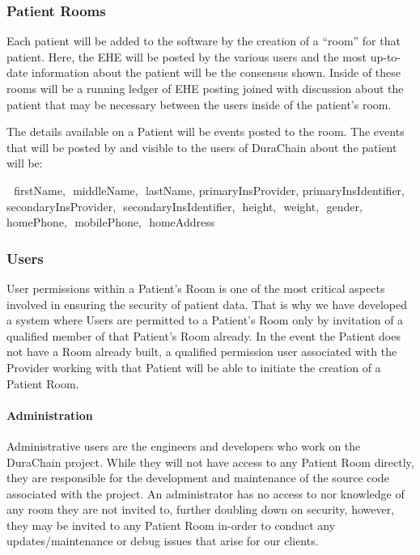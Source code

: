 \documentclass[12pt]{article}
\begin{document}
    \subsubsection{Patient Rooms}
    Each patient will be added to the software by the creation of a “room” for that patient. Here, the EHE will be posted by the various users and the most up-to-date information about the patient will be the consensus shown. Inside of these rooms will be a running ledger of EHE posting joined with discussion about the patient that may be necessary between the users inside of the patient’s room.

    The details available on a Patient will be events posted to the room. The events that will be posted by and visible to the users of DuraChain about the patient will be:

    { 
    firstName, 
    middleName, 
    lastName,
    primaryInsProvider,
    primaryInsIdentifier, 
    secondaryInsProvider, 
    secondaryInsIdentifier, 
    height, 
    weight, 
    gender, 
    homePhone, 
    mobilePhone, 
    homeAddress
    }

    \subsubsection{Users}
    User permissions within a Patient’s Room is one of the most critical aspects involved in ensuring the security of patient data. That is why we have developed a system where Users are permitted to a Patient’s Room only by invitation of a qualified member of that Patient’s Room already. In the event the Patient does not have a Room already built, a qualified permission user associated with the Provider working with that Patient will be able to initiate the creation of a Patient Room.

    \paragraph{Administration}
    Administrative users are the engineers and developers who work on the DuraChain project. While they will not have access to any Patient Room directly, they are responsible for the development and maintenance of the source code associated with the project. An administrator has no access to nor knowledge of any room they are not invited to, further doubling down on security, however, they may be invited to any Patient Room in-order to conduct any updates/maintenance or debug issues that arise for our clients.
\end{document}
